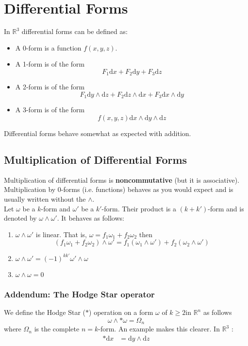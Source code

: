 \documentclass[twocolumn,10pt]{article}
\begin{document}
\thispagestyle{empty}
\section{Differential Forms}	
In $\mathbb{R}^{3}$ differential forms can be defined as:	
\begin{itemize}
	\item A 0-form is a function $f(x,y,z)$.
	\item A 1-form is of the form
		\[
			F_1\mathrm{d}x + F_2\mathrm{d}y + F_3\mathrm{d}z
		\] 
	\item A 2-form is of the form
		\[
			F_1\mathrm{d}y\wedge \mathrm{d}z + F_2\mathrm{d}z \wedge \mathrm{d}x + F_3\mathrm{d}x\wedge \mathrm{d}y
		\] 
	\item A 3-form is of the form
		\[
			f(x,y,z)\mathrm{d}x\wedge \mathrm{d}y\wedge \mathrm{d}z
		\] 
\end{itemize}
Differential forms behave somewhat as expected with addition.
\subsection{Multiplication of Differential Forms}
Multiplication of differential forms is \textbf{noncommutative} (but it is associative). Multiplication by 0-forms (i.e. functions) behaves as you would expect and is usually written without the $\wedge$.\\
Let $\omega$ be a $k$-form and $\omega'$ be a $k'$-form. Their product is a $(k+k')$-form and is denoted by $\omega \wedge \omega'$. It behaves as follows:
\begin{enumerate}[label=\alph*.]
	\item $\omega \wedge \omega'$ is linear. That is, $\omega = f_1\omega_1 + f_2\omega_2$ then
		\[
			(f_1\omega_1 + f_2\omega_2)\wedge \omega' = f_1(\omega_1\wedge \omega') + f_2(\omega_2\wedge \omega')
		\] 
	\item $\omega \wedge \omega' = (-1)^{kk'}\omega' \wedge \omega$ 
	\item $\omega \wedge \omega = 0$
\end{enumerate}
\subsubsection{Addendum: The Hodge Star operator}
We define the Hodge Star ($*$) operation on a form $\omega$ of $k\geq 2$in $\mathbb{R}^{n}$ as follows
\[
	\omega \wedge *\omega = \Omega_n 
\] 
where $\Omega_n$ is the complete $n=k$-form. An example makes this clearer. In $\mathbb{R}^{3}$ :
\begin{align*}
	*\mathrm{d} x &= \mathrm{d} y \wedge \mathrm{d} z	
\end{align*}
\end{document}
